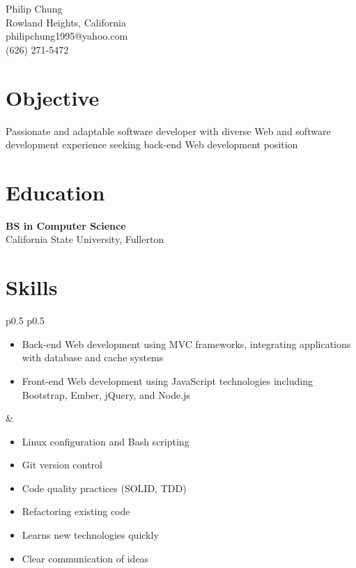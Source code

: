 \documentclass[10pt]{article}
\newcommand{\baseheader}[3]{#1 \marginpar{\raggedleft #2} \\ #3}
\begin{document}
	\begin{center}
		{\LARGE Philip Chung} \\
		Rowland Heights, California \\
		philipchung1995@yahoo.com \\
		(626) 271-5472 \\
	\end{center}

	\section*{Objective}

	Passionate and adaptable software developer with diverse Web and software development experience seeking back-end Web development position

	\section*{Education}

	\baseheader{\textbf{BS in Computer Science}}{1/2018}{California State University, Fullerton}

	\section*{Skills}

	\begin{tabular}{p{0.5\textwidth} p{0.5\textwidth}}
		\begin{minipage}[t]{\linewidth}
			\raggedright
			\begin{itemize}[nosep]
				\item Back-end Web development using MVC frameworks, integrating applications with database and cache systems
				\item Front-end Web development using JavaScript technologies including Bootstrap, Ember, jQuery, and Node.js
			\end{itemize}
		\end{minipage}
		&
		\begin{minipage}[t]{\linewidth}
			\raggedright
			\begin{itemize}[nosep]
				\item Linux configuration and Bash scripting
				\item Git version control
				\item Code quality practices (SOLID, TDD)
				\item Refactoring existing code
				\item Learns new technologies quickly
				\item Clear communication of ideas
			\end{itemize}
		\end{minipage}
	\end{tabular}
\end{document}
